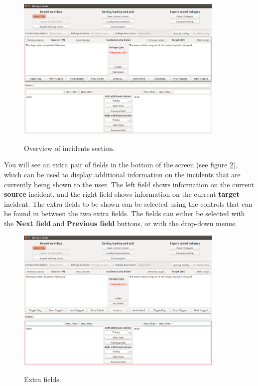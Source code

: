 \documentclass{memoir}
\begin{document}
\begin{figure}[h!]
  \centering
  \caption{Overview of incidents section.}
  \includegraphics[width=100mm]{Screenshot_5.pdf}
  \label{fig:incidentsoverview}
\end{figure}

You will see an extra pair of fields in the bottom of the screen (see figure \ref{fig:extrafields}), which can be used to display additional information on the incidents that are currently being shown to the user. The left field shows information on the current \textbf{source} incident, and the right field shows information on the current \textbf{target} incident. The extra fields to be shown can be selected using the controls that can be found in between the two extra fields. The fields can either be selected with the \textbf{Next field} and \textbf{Previous field} buttons, or with the drop-down menus.

\begin{figure}[h!]
  \centering
  \caption{Extra fields.}
  \includegraphics[width=100mm]{Screenshot_6.pdf}
  \label{fig:extrafields}
\end{figure}
\end{document}
